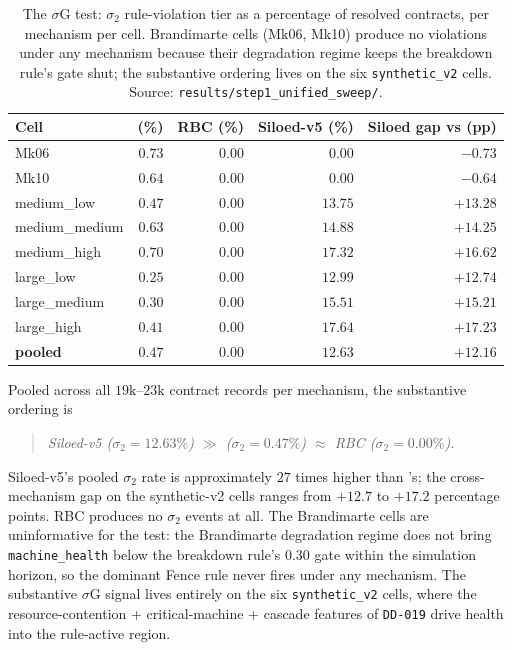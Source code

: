 \begin{table}[ht]
\centering
\caption{The $\sigma$G test: $\sigma_2$ rule-violation tier as a
percentage of resolved contracts, per mechanism per cell. Brandimarte
cells (Mk06, Mk10) produce no violations under any mechanism
because their degradation regime keeps the breakdown rule's gate
shut; the substantive ordering lives on the six \texttt{synthetic\_v2}
cells. Source: \texttt{results/step1\_unified\_sweep/}.}
\label{tab:val-sigma}
\small
\begin{tabularx}{\textwidth}{@{}l r r r r@{}}
\toprule
\textbf{Cell} & \textbf{\NEXUS{} (\%)} & \textbf{RBC (\%)}
              & \textbf{Siloed-v5 (\%)}
              & \textbf{Siloed gap vs \NEXUS{} (pp)} \\
\midrule
Mk06            & $0.73$ & $0.00$ & $\phantom{1}0.00$ & $-0.73$ \\
Mk10            & $0.64$ & $0.00$ & $\phantom{1}0.00$ & $-0.64$ \\
medium\_low     & $0.47$ & $0.00$ & $13.75$ & $+13.28$ \\
medium\_medium  & $0.63$ & $0.00$ & $14.88$ & $+14.25$ \\
medium\_high    & $0.70$ & $0.00$ & $17.32$ & $+16.62$ \\
large\_low      & $0.25$ & $0.00$ & $12.99$ & $+12.74$ \\
large\_medium   & $0.30$ & $0.00$ & $15.51$ & $+15.21$ \\
large\_high     & $0.41$ & $0.00$ & $17.64$ & $+17.23$ \\
\midrule
\textbf{pooled} & $\mathbf{0.47}$ & $\mathbf{0.00}$ & $\mathbf{12.63}$ & $+12.16$ \\
\bottomrule
\end{tabularx}
\end{table}

Pooled across all $19\text{k}$--$23\text{k}$ contract records per
mechanism, the substantive ordering is

\begin{quote}
\itshape
Siloed-v5 ($\sigma_2 = 12.63\%$) \;$\gg$\;
\NEXUS{} ($\sigma_2 = 0.47\%$) \;$\approx$\; RBC ($\sigma_2 = 0.00\%$).
\end{quote}

Siloed-v5's pooled $\sigma_2$ rate is approximately $27$ times higher
than \NEXUS{}'s; the cross-mechanism gap on the synthetic-v2 cells
ranges from $+12.7$ to $+17.2$ percentage points. RBC produces no
$\sigma_2$ events at all. The Brandimarte cells are uninformative for
the test: the Brandimarte degradation regime does not bring
\texttt{machine\_health} below the breakdown rule's $0.30$ gate
within the simulation horizon, so the dominant Fence rule never
fires under any mechanism. The substantive $\sigma$G signal lives
entirely on the six \texttt{synthetic\_v2} cells, where the
resource-contention + critical-machine + cascade features of
\texttt{DD-019} drive health into the rule-active region.

